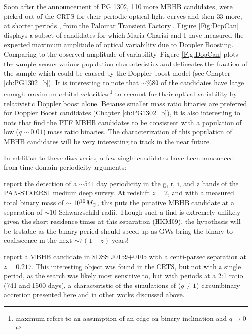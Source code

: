 Soon after the announcement of PG 1302, 110 more MBHB candidates, were picked
out of the CRTS for their periodic optical light curves \citep{Graham+2015b}
and then 33 more, at shorter periods \citep{Charisi+2016}, from the Palomar
Transient Factory \citep[PTF][]{Rau:2009, Law:2009}. Figure \ref{Fig:DopCan}
displays a subset of candidates for which Maria Charisi and I have measured
the expected maximum amplitude of optical variability due to Doppler Boosting.
Comparing to the observed amplitude of variability, Figure \ref{Fig:DopCan}
plots the sample versus various population characteristics and delineates the
fraction of the sample which could be caused by the Doppler boost model (see
Chapter \ref{ch:PG1302_b}). It is interesting to note that $\sim \% 80$ of the
candidates have large enough maximum orbital velocities \footnote{maximum
refers to an assumption of an edge on binary inclination and $q \rightarrow
0$} to account for their optical variability by relativistic Doppler boost
alone. Because smaller mass ratio binaries are preferred for Doppler Boost
candidates (Chapter \ref{ch:PG1302_b}), it is also interesting to note that
\citep{Charisi+2016} find the PTF MBHB candidates to be consistent with a
population of low ($q\sim0.01$) mass ratio binaries. The characterization of
this population of MBHB candidates will be very interesting to track in the
near future.


In addition to these discoveries, a few single candidates have been announced
from time domain periodicity arguments: 

\cite{Liu:7RsMBHB:2015} report the detection of a $\sim 541$ day periodicity in
the g, r, i, and z bands of the PAN-STARRS1 medium deep survey. At redshift
$z=2$, and with a measured total binary mass of $\sim 10^{10} {M_{\odot}}$, this
puts the putative MBHB candidate at a separation of $\sim10$ Schwarzschild
radii. Though such a find is extremely unlikely given the short residence
times at this separation (HKM09), the hypothesis will be testable as the binary
period should speed up as GWs bring the binary to coalescence in the next
$\sim 7 (1+z)$ years!


\cite{Zheng:MBHB_2P:2015} report a MBHB candidate in SDSS J0159+0105 with a
centi-parsec separation at $z=0.217$. This interesting object was found in the
CRTS, but not with a single period, as the \cite{Graham+2015b} search was
likely most sensitive to, but with periods at a 2:1 ratio (741 and 1500
days), a characteristic of the simulations of ($q \neq 1$) circumbinary
accretion presented here and in other works discussed above.



